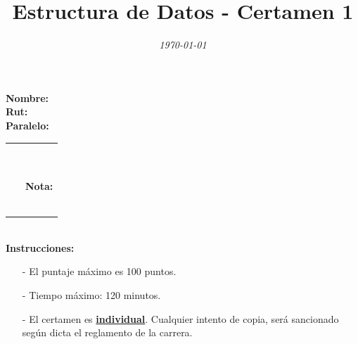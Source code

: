 \documentclass{exam}
\title{\LARGE\color{azul}\textbf{Estructura de Datos - Certamen 1 }}
\author{\smallsize \color{gray}{Profesor: } \color{black}{\textbf{Eduardo Godoy}}}
\date{\normalsize \em \today}
\begin{document}

\maketitle

\begin{multicols}{2}
  \begin{flushleft}
    \textbf{Nombre:} \\
    \vspace*{2mm}
    \textbf{Rut:} \\
    \vspace*{2mm}
    \textbf{Paralelo:}
  \end{flushleft}
  \begin{center}
    \begin{table}[H]
      \begin{tabular}{p{4cm}|p{3cm}|}
        \arrayrulecolor{gray!50}\cline{2-2} ~ & {\em {\scriptsize \color{gray!50}{Puntaje:}}}\\
         & ~ \\
         ~ & \textbf{Nota:}
        \\ & ~ \\
        \arrayrulecolor{gray!50}\cline{2-2}
      \end{tabular}
    \end{table}
  \end{center}
\end{multicols}

\noindent
\textbf{\\Instrucciones:}
\begin{itemize}
\item[-] El puntaje máximo  es 100 puntos.
\item[-] Tiempo máximo: 120 minutos.
\item[-] El certamen es \underline{\textbf{individual}}. Cualquier intento de copia, será sancionado según dicta el reglamento de la carrera.
\end{itemize}
\end{document}
